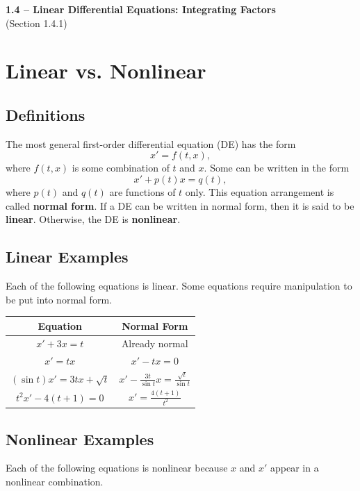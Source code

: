 \documentclass[09pt,letterpaper]{article}
\begin{document}
\begin{center}
\Large\textbf{1.4 – Linear Differential Equations: Integrating Factors}\\
\normalsize (Section 1.4.1)
\end{center}


\section{Linear vs. Nonlinear}

\subsection{Definitions}
The most general first-order differential equation (DE) has the form
\[
x' = f(t,x),
\]
where $f(t,x)$ is some combination of $t$ and $x$. Some can be written in the form
\[
x' + p(t)x = q(t),
\]
where $p(t)$ and $q(t)$ are functions of $t$ only. This equation arrangement is called \textbf{normal form}. If a DE can be written in normal form, then it is said to be \textbf{linear}. Otherwise, the DE is \textbf{nonlinear}. 

\subsection{Linear Examples}
Each of the following equations is linear. Some equations require manipulation to be put into normal form. 

\begin{center}
\begin{tabular}{c c}
\hline
Equation & Normal Form\\
\hline
$x' + 3x = t$ & Already normal \\[1mm]
$x' = tx$ & $x'-tx = 0$ \\[1mm]
$(\sin t)x' = 3tx + \sqrt{t}$ & $x' - \frac{3t}{\sin t} x=\frac{\sqrt{t}}{\sin t}$ \\[1mm]
$t^2x' - 4(t+1) = 0$ & $x' =\frac{4(t+1)}{t^2}$ \\[1mm]
\hline
\end{tabular}
\end{center}

\subsection{Nonlinear Examples}
Each of the following equations is nonlinear because $x$ and $x'$ appear in a nonlinear combination.
\end{document}
